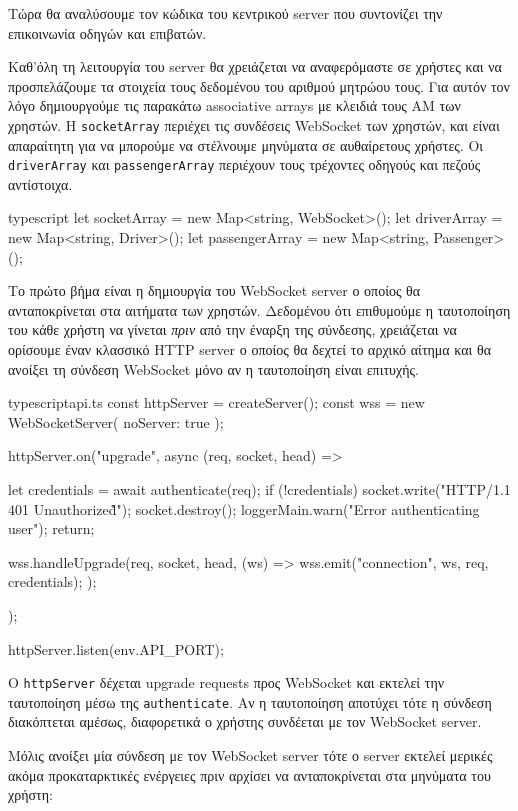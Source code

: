 \documentclass[../thesis.tex]{subfiles}
\begin{document}
Τώρα θα αναλύσουμε τον κώδικα του κεντρικού server που συντονίζει την επικοινωνία οδηγών και επιβατών.

Καθ'όλη τη λειτουργία του server θα χρειάζεται να αναφερόμαστε σε χρήστες και να προσπελάζουμε τα στοιχεία τους δεδομένου του αριθμού μητρώου τους.
Για αυτόν τον λόγο δημιουργούμε τις παρακάτω associative arrays με κλειδιά τους ΑΜ των χρηστών.
Η \verb|socketArray| περιέχει τις συνδέσεις WebSocket των χρηστών, και είναι απαραίτητη για να μπορούμε να στέλνουμε μηνύματα σε αυθαίρετους χρήστες.
Οι \verb|driverArray| και \verb|passengerArray| περιέχουν τους τρέχοντες οδηγούς και πεζούς αντίστοιχα. 

\begin{codeblock}{typescript}
  let socketArray = new Map<string, WebSocket>();
  let driverArray = new Map<string, Driver>();
  let passengerArray = new Map<string, Passenger>();
\end{codeblock}

Το πρώτο βήμα είναι η δημιουργία του WebSocket server ο οποίος θα ανταποκρίνεται στα αιτήματα των χρηστών.
Δεδομένου ότι επιθυμούμε η ταυτοποίηση του κάθε χρήστη να γίνεται \textit{πριν} από την έναρξη της σύνδεσης, χρειάζεται να ορίσουμε έναν κλασσικό HTTP server ο οποίος θα δεχτεί το αρχικό αίτημα και θα ανοίξει τη σύνδεση WebSocket μόνο αν η ταυτοποίηση είναι επιτυχής.

\begin{codeblock}{typescript}{api.ts}
  const httpServer = createServer();
  const wss = new WebSocketServer({ noServer: true });

  httpServer.on("upgrade", async (req, socket, head) => {
    let credentials = await authenticate(req);
    if (!credentials) {
      socket.write("HTTP/1.1 401 Unauthorized\r\n\r\n");
      socket.destroy();
      loggerMain.warn("Error authenticating user");
      return;
    }

    wss.handleUpgrade(req, socket, head, (ws) => {
      wss.emit("connection", ws, req, credentials);
    });
  });  

  httpServer.listen(env.API_PORT);
\end{codeblock}

Ο \verb|httpServer| δέχεται upgrade requests προς WebSocket και εκτελεί την ταυτοποίηση μέσω της \verb|authenticate|.
Αν η ταυτοποίηση αποτύχει τότε η σύνδεση διακόπτεται αμέσως, διαφορετικά ο χρήστης συνδέεται με τον WebSocket server.

Μόλις ανοίξει μία σύνδεση με τον WebSocket server τότε ο server εκτελεί μερικές ακόμα προκαταρκτικές ενέργειες πριν αρχίσει να ανταποκρίνεται στα μηνύματα του χρήστη:
\end{document}
